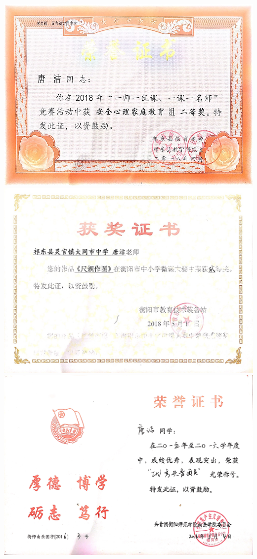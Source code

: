 \documentclass[UFT8]{ctexart}%
\begin{document}
\begin{center}
 \includegraphics[scale=0.37]{figs/2018-04.png }
 \includegraphics[scale=0.25]{figs/2018-05.png }
 \includegraphics[scale=0.1]{figs/2016-05.png }

\end{center}
\end{document}
